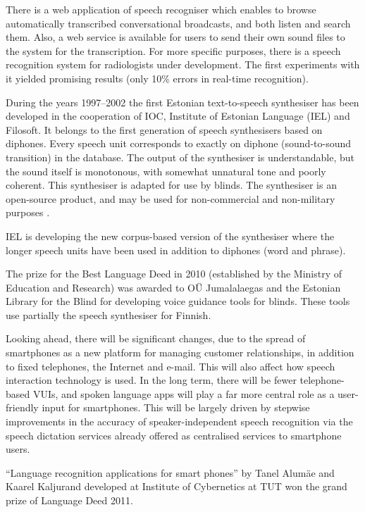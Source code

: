 \begin{multicols}{2}
There is a web application of speech recogniser which enables to browse automatically transcribed conversational broadcasts, and both listen and search them. 
Also, a web service is available for users to send their own sound files to the system for the transcription. 
For more specific purposes, there is a speech recognition system for radiologists under development. 
The first experiments with it yielded promising results (only 10\% errors in real-time recognition).

During the years 1997--2002 the first Estonian text-to-speech synthesiser has been developed in the cooperation of IOC, Institute of Estonian Language (IEL) and Filosoft. 
It belongs to the first generation of speech synthesisers based on diphones. 
Every speech unit corresponds to exactly on diphone (sound-to-sound transition) in the database. 
The output of the synthesiser is understandable, but the sound itself is monotonous, with somewhat unnatural tone and poorly coherent. 
This synthesiser is adapted for use by blinds. 
The synthesiser is an open-source product, and may be used for non-commercial and non-military purposes \cite{IEL}. 

IEL is developing the new corpus-based version of the synthesiser where the longer speech units have been used in addition to diphones (word and phrase). 

The prize for the Best Language Deed in 2010 (established by the Ministry of Education and Research) was awarded to OÜ Jumalalaegas and the Estonian Library for the Blind for developing voice guidance tools for blinds. 
These tools use partially the speech synthesiser for Finnish.

Looking ahead, there will be significant changes, due to the spread of smartphones as a new platform for managing customer relationships, in addition to fixed telephones, the Internet and e-mail. This will also affect how speech interaction technology is used. In the long term, there will be fewer telephone-based VUIs, and spoken language apps will play a far more central role as a user-friendly input for smartphones. This will be largely driven by stepwise improvements in the accuracy of speaker-independent speech recognition via the speech dictation services already offered as centralised services to smartphone users. 

``Language recognition applications for smart phones'' by Tanel Alumäe
and Kaarel Kaljurand  developed at Institute of Cybernetics at TUT won
the grand prize of Language Deed 2011. 


\end{multicols}
